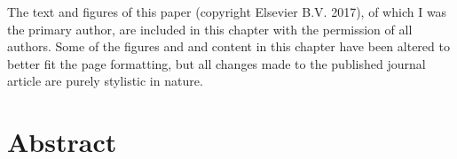 \vspace{0.5cm}



The text and figures of this paper (copyright Elsevier B.V. 2017), of which I was the primary author, are
included in this chapter with the permission of all authors. 
Some of the figures and and content in this chapter have been altered to better fit the page formatting, but all changes made to the published journal article are purely stylistic in nature.

% 



% 
% 
\section{Abstract}



% 
% 





